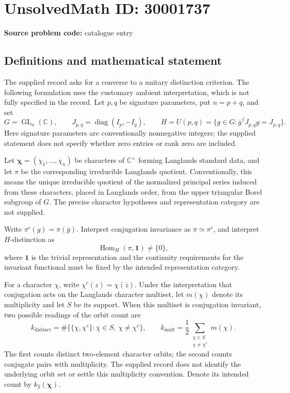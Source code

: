 \documentclass[11pt]{article}
\newcommand{\C}{\mathbb{C}}
\begin{document}
\section*{UnsolvedMath ID: 30001737}
\textbf{Source problem code:} catalogue entry
\subsection{Definitions and mathematical statement}
The supplied record asks for a converse to a unitary distinction criterion. The following formulation uses the customary ambient interpretation, which is not fully specified in the record. Let \(p,q\) be signature parameters, put \(n=p+q\), and set
\[
G=\operatorname{GL}_n(\C),\qquad J_{p,q}=\operatorname{diag}(I_p,-I_q),\qquad H=U(p,q)=\{g\in G:\overline g^{\,t}J_{p,q}g=J_{p,q}\}.
\]
Here signature parameters are conventionally nonnegative integers; the supplied statement does not specify whether zero entries or rank zero are included.

Let \(\boldsymbol\chi=(\chi_1,\ldots,\chi_n)\) be characters of \(\C^\times\) forming Langlands standard data, and let \(\pi\) be the corresponding irreducible Langlands quotient. Conventionally, this means the unique irreducible quotient of the normalized principal series induced from these characters, placed in Langlands order, from the upper triangular Borel subgroup of \(G\). The precise character hypotheses and representation category are not supplied.

Write \(\pi^c(g)=\pi(\overline g)\). Interpret conjugation invariance as \(\pi\simeq\pi^c\), and interpret \(H\)-distinction as
\[
\operatorname{Hom}_{H}(\pi,\mathbf 1)\ne\{0\},
\]
where \(\mathbf 1\) is the trivial representation and the continuity requirements for the invariant functional must be fixed by the intended representation category.

For a character \(\chi\), write \(\chi^c(z)=\chi(\overline z)\). Under the interpretation that conjugation acts on the Langlands character multiset, let \(m(\chi)\) denote its multiplicity and let \(S\) be its support. When this multiset is conjugation invariant, two possible readings of the orbit count are
\[
 k_{\mathrm{distinct}}=\#\{\{\chi,\chi^c\}:\chi\in S,\ \chi\ne\chi^c\},
 \qquad
 k_{\mathrm{mult}}=\frac12\sum_{\substack{\chi\in S\\\chi\ne\chi^c}}m(\chi).
\]
The first counts distinct two-element character orbits; the second counts conjugate pairs with multiplicity. The supplied record does not identify the underlying orbit set or settle this multiplicity convention. Denote its intended count by \(k_2(\boldsymbol\chi)\).
\end{document}
